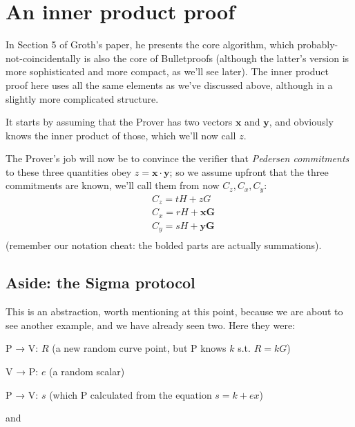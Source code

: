\documentclass[10pt,a4paper]{article}
\begin{document}
\hypertarget{an-inner-product-proof}{%
\section[An inner product
proof]{\texorpdfstring{\protect\hypertarget{anchor-34}{}{}An inner
product proof}{An inner product proof}}\label{an-inner-product-proof}}

In Section 5 of Groth's paper, he presents the core algorithm, which
probably-not-coincidentally is also the core of Bulletproofs (although
the latter's version is more sophisticated and more compact, as we'll
see later). The inner product proof here uses all the same elements as
we've discussed above, although in a slightly more complicated
structure.

It starts by assuming that the Prover has two vectors $\mathbf{x}$ and
$\mathbf{y}$, and obviously knows the inner product of those, which we'll
now call $z$.

The Prover's job will now be to convince the verifier that
\emph{Pedersen commitments }to these three quantities obey $z = \mathbf{x} \cdot \mathbf{y}$; so we
assume upfront that the three commitments are known, we'll call them
from now $C_z, C_x, C_y$:
\begin{align*}
& C_z = tH + zG \\
& C_x = rH + \mathbf{xG} \\
& C_y = sH + \mathbf{yG} \\
\end{align*}
(remember our notation cheat: the bolded parts are actually summations).

\hypertarget{aside-the-sigma-protocol}{%
\subsection[Aside: the Sigma
protocol]{\texorpdfstring{\protect\hypertarget{anchor-35}{}{}Aside: the
Sigma
protocol}{Aside: the Sigma protocol}}\label{aside-the-sigma-protocol}}

This is an abstraction, worth mentioning at this point, because we are
about to see another example, and we have already seen two. Here they
were:

P → V: $R$ (a new random curve point, but P knows $k$ s.t. $R=kG$)

V → P: $e$ (a random scalar)

P → V: $s$ (which P calculated from the equation $s=k+ex$)

and
\end{document}
